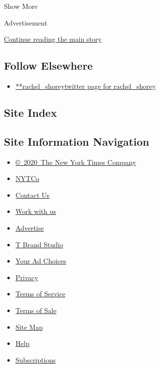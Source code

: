 Show More

Advertisement

\protect\hyperlink{after-mid2}{Continue reading the main story}

\hypertarget{follow-elsewhere}{%
\subsection{Follow Elsewhere}\label{follow-elsewhere}}

\begin{itemize}
\tightlist
\item
  \href{https://twitter.com/rachel_shorey}{**rachel\_shoreytwitter page
  for rachel\_shorey}
\end{itemize}

\hypertarget{site-index}{%
\subsection{Site Index}\label{site-index}}

\hypertarget{site-information-navigation}{%
\subsection{Site Information
Navigation}\label{site-information-navigation}}

\begin{itemize}
\tightlist
\item
  \href{https://help.nytimes3xbfgragh.onion/hc/en-us/articles/115014792127-Copyright-notice}{©~2020~The
  New York Times Company}
\end{itemize}

\begin{itemize}
\tightlist
\item
  \href{https://www.nytco.com/}{NYTCo}
\item
  \href{https://help.nytimes3xbfgragh.onion/hc/en-us/articles/115015385887-Contact-Us}{Contact
  Us}
\item
  \href{https://www.nytco.com/careers/}{Work with us}
\item
  \href{https://nytmediakit.com/}{Advertise}
\item
  \href{http://www.tbrandstudio.com/}{T Brand Studio}
\item
  \href{https://www.nytimes3xbfgragh.onion/privacy/cookie-policy\#how-do-i-manage-trackers}{Your
  Ad Choices}
\item
  \href{https://www.nytimes3xbfgragh.onion/privacy}{Privacy}
\item
  \href{https://help.nytimes3xbfgragh.onion/hc/en-us/articles/115014893428-Terms-of-service}{Terms
  of Service}
\item
  \href{https://help.nytimes3xbfgragh.onion/hc/en-us/articles/115014893968-Terms-of-sale}{Terms
  of Sale}
\item
  \href{https://spiderbites.nytimes3xbfgragh.onion}{Site Map}
\item
  \href{https://help.nytimes3xbfgragh.onion/hc/en-us}{Help}
\item
  \href{https://www.nytimes3xbfgragh.onion/subscription?campaignId=37WXW}{Subscriptions}
\end{itemize}
